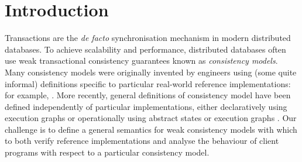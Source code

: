 \section{Introduction}
\label{sec:intro}

Transactions are the \emph{de facto} synchronisation mechanism in
modern distributed databases. To achieve scalability and performance,
distributed databases often use weak transactional consistency
guarantees known as \emph{consistency models}.  Many consistency
models were originally invented by engineers using (some quite
informal) definitions specific to particular real-world reference
implementations: for example,
\cite{gdur,ramp,CORFU,tango,si,distrsi,clocksi,redblue,rola,cops,PSI-RA,NMSI,PSI,wren}.
More recently, general definitions of consistency model have been
defined independently of particular implementations, either
declaratively using execution graphs \cite{adya,ev_transactions} or
operationally using abstract 
states or execution graphs
\cite{seebelieve,alonetogether,sureshConcur}. 
Our challenge  is to define a general semantics for weak consistency
models  with which to both 
verify  reference  implementations {and} analyse 
the behaviour of client programs with respect to a particular consistency
model. 






